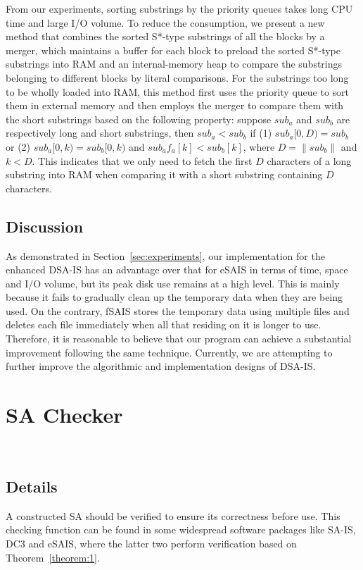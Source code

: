 \documentclass[10pt,journal,compsoc]{IEEEtran}
\begin{document}
From our experiments, sorting substrings by the priority queues takes long CPU time and large I/O volume. To reduce the consumption, we present a new method that combines the sorted S*-type substrings of all the blocks by a merger, which maintains a buffer for each block to preload the sorted S*-type substrings into RAM and an internal-memory heap to compare the substrings belonging to different blocks by literal comparisons. For the substrings too long to be wholly loaded into RAM, this method first uses the priority queue to sort them in external memory and then employs the merger to compare them with the short substrings based on the following property: suppose $sub_a$ and $sub_b$ are respectively long and short substrings, then $sub_a < sub_b$ if (1) $sub_a[0, D) = sub_b$ or (2) $sub_a[0, k) = sub_b[0, k)$ and $sub_af_a[k] < sub_b[k]$, where $D = \|sub_b\|$ and $k < D$. This indicates that we only need to fetch the first $D$ characters of a long substring into RAM when comparing it with a short substring containing $D$ characters. 

\subsection{Discussion} \label{subsec:further_discussion}

As demonstrated in Section~\ref{sec:experiments}, our implementation for the enhanced DSA-IS has an advantage over that for eSAIS in terms of time, space and I/O volume, but its peak disk use remains at a high level. This is mainly because it fails to gradually clean up the temporary data when they are being used. On the contrary, fSAIS stores the temporary data using multiple files and deletes each file immediately when all that residing on it is longer to use. Therefore, it is reasonable to believe that our program can achieve a substantial improvement following the same technique. Currently, we are attempting to further improve the algorithmic and implementation designs of DSA-IS. 

\section{SA Checker}~\label{sec:check_sa}

\subsection{Details} 

A constructed SA should be verified to ensure its correctness before use. This checking function can be found in some widespread software packages like SA-IS, DC3 and eSAIS, where the latter two perform verification based on Theorem~\ref{theorem:1}.
\end{document}
